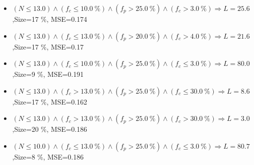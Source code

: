 \documentclass[numbered]{CSL}
\begin{document}
\begin{itemize}
\item $(N \leq 13.0) \land (f_c \leq 10.0~\%) \land (f_p > 25.0~\%) \land (f_c > 3.0~\%) \Rightarrow L = 25.6$,\hfill Size=17 \%, MSE=0.174
\item $(N \leq 13.0) \land (f_c \leq 13.0~\%) \land (f_p > 20.0~\%) \land (f_c > 4.0~\%) \Rightarrow L = 21.6$,\hfill Size=17 \%, MSE=0.17
\item $(N \leq 13.0) \land (f_c \leq 10.0~\%) \land (f_p > 25.0~\%) \land (f_c \leq 3.0~\%) \Rightarrow L = 80.0$,\hfill Size=9 \%, MSE=0.191
\item $(N \leq 13.0) \land (f_c > 13.0~\%) \land (f_p > 25.0~\%) \land (f_c \leq 30.0~\%) \Rightarrow L = 8.6$,\hfill Size=17 \%, MSE=0.162
\item $(N \leq 13.0) \land (f_c > 13.0~\%) \land (f_p > 25.0~\%) \land (f_c > 30.0~\%) \Rightarrow L = 3.0$,\hfill Size=20 \%, MSE=0.186
\item $(N \leq 10.0) \land (f_c \leq 13.0~\%) \land (f_p > 25.0~\%) \land (f_c \leq 3.0~\%) \Rightarrow L = 80.7$,\hfill Size=8 \%, MSE=0.186
\end{itemize}
\end{document}
